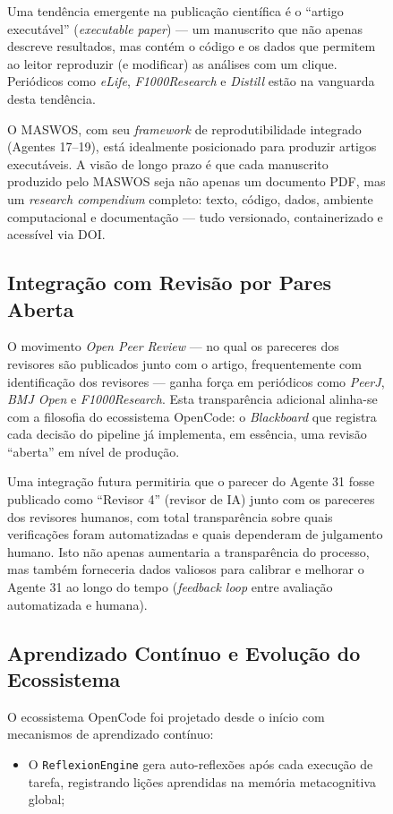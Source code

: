 \begin{figure}
Uma tendência emergente na publicação científica é o ``artigo
executável'' (\textit{executable paper}) — um manuscrito que não
apenas descreve resultados, mas contém o código e os dados que
permitem ao leitor reproduzir (e modificar) as análises com um
clique. Periódicos como \textit{eLife}, \textit{F1000Research} e
\textit{Distill} estão na vanguarda desta tendência.

O MASWOS, com seu \textit{framework} de reprodutibilidade
integrado (Agentes 17--19), está idealmente posicionado para
produzir artigos executáveis. A visão de longo prazo é que cada
manuscrito produzido pelo MASWOS seja não apenas um documento
PDF, mas um \textit{research compendium} completo: texto, código,
dados, ambiente computacional e documentação — tudo versionado,
containerizado e acessível via DOI.

\subsection{Integração com Revisão por Pares Aberta}
\label{sec:revisao_aberta}

O movimento \textit{Open Peer Review} — no qual os pareceres dos
revisores são publicados junto com o artigo, frequentemente com
identificação dos revisores — ganha força em periódicos como
\textit{PeerJ}, \textit{BMJ Open} e \textit{F1000Research}. Esta
transparência adicional alinha-se com a filosofia do ecossistema
OpenCode: o \textit{Blackboard} que registra cada decisão do
pipeline já implementa, em essência, uma revisão ``aberta'' em
nível de produção.

Uma integração futura permitiria que o parecer do Agente 31 fosse
publicado como ``Revisor 4'' (revisor de IA) junto com os
pareceres dos revisores humanos, com total transparência sobre
quais verificações foram automatizadas e quais dependeram de
julgamento humano. Isto não apenas aumentaria a transparência do
processo, mas também forneceria dados valiosos para calibrar e
melhorar o Agente 31 ao longo do tempo (\textit{feedback loop}
entre avaliação automatizada e humana).

\subsection{Aprendizado Contínuo e Evolução do Ecossistema}
\label{sec:aprendizado_continuo}

O ecossistema OpenCode foi projetado desde o início com
mecanismos de aprendizado contínuo:

\begin{itemize}
    \item O \texttt{ReflexionEngine} gera auto-reflexões após cada
    execução de tarefa, registrando lições aprendidas na memória
    metacognitiva global;


\end{itemize}
\end{figure}
